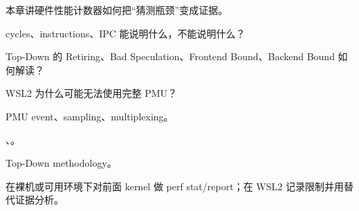 {本章讲硬件性能计数器如何把“猜测瓶颈”变成证据。}
{\item cycles、instructions、IPC 能说明什么，不能说明什么？
\item Top-Down 的 Retiring、Bad Speculation、Frontend Bound、Backend Bound 如何解读？
\item WSL2 为什么可能无法使用完整 PMU？}
{\item PMU event、sampling、multiplexing。
\item {}、。
\item Top-Down methodology。}
{在裸机或可用环境下对前面 kernel 做 perf stat/report；在 WSL2 记录限制并用替代证据分析。}

